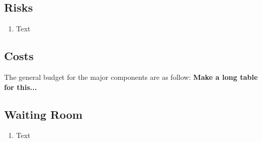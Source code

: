 \documentclass [11pt]{article}
\begin{document}
\subsection{Risks}
	\begin{enumerate}[label=\textbf{(\roman*)}]
		\item Text
	\end{enumerate}

\subsection{Costs}	
The general budget for the major components are as follow:
\textbf{Make a long table for this...}
%		


\subsection{Waiting Room}
	\begin{enumerate}[label=\textbf{(\roman*)}]
		\item Text
	    \end{enumerate} 

\end{document}
